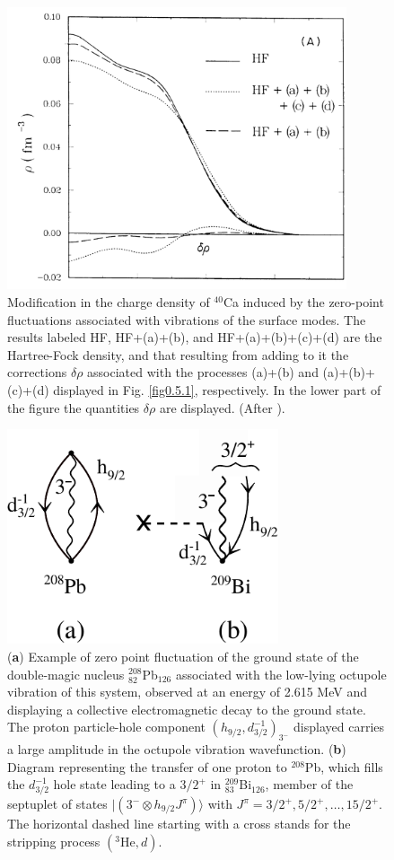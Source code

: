 \documentclass[a4paper,11pt]{book}
\numberwithin{equation}{section}
\numberwithin{figure}{section}
\numberwithin{table}{section}
\newcommand{\ket}[1]{|{#1} \rangle }
\begin{document}
\begin{figure}
	\centerline {
		\includegraphics*[width=10cm, angle=0.]{introduccion/figs/fig0_8_2}
	}
	\caption{Modification in the charge density of $^{40}$Ca induced by the zero-point fluctuations associated with vibrations of the surface modes. The results labeled HF, HF+(a)+(b), and HF+(a)+(b)+(c)+(d) are the Hartree-Fock density, and that resulting from adding to it the corrections $\delta\rho$ associated with the processes (a)+(b) and (a)+(b)+(c)+(d) displayed in Fig. \ref{fig0.5.1}, respectively. In the lower part of the figure the  quantities $\delta\rho$ are displayed. (After \cite{Barranco:87a}).}
	\label{fig0.5.2}
\end{figure}
\begin{figure}
	\centerline {
		\includegraphics*[width=8cm, angle=0.]{introduccion/figs/fig0_5_3}
	}
	\caption{(\textbf{a}) Example of zero point fluctuation of the ground state of the double-magic nucleus $^{208}_{82}$Pb$_{126}$ associated with the low-lying octupole vibration of this system, observed at an energy of 2.615 MeV and displaying a collective electromagnetic decay to the ground state. The proton particle-hole component $(h_{9/2},d^{-1}_{3/2})_{3^-}$ displayed carries a large amplitude in the octupole vibration wavefunction. (\textbf{b}) Diagram representing the transfer of one proton to $^{208}$Pb, which fills the $d_{3/2}^{-1}$ hole state leading to a $3/2^+$ in $^{209}_{83}$Bi$_{126}$, member of the septuplet of states $\ket{(3^-\otimes h_{9/2}J^\pi)}$ with $J^\pi=3/2^+,5/2^+,\dots,15/2^+$. The horizontal dashed line starting with a cross stands for the stripping process $(^3\text{He},d)$.}
	\label{fig0.5.3}
\end{figure}
\end{document}

